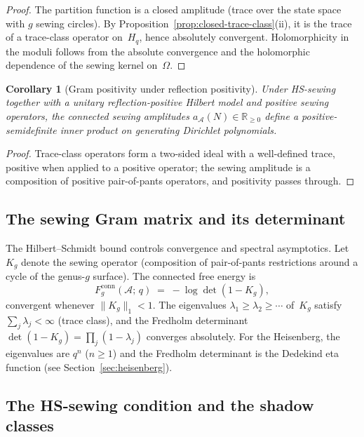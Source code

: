 \documentclass[11pt,reqno]{amsart}
\newtheorem{corollary}[theorem]{Corollary}
\theoremstyle{definition}
\theoremstyle{remark}
\newcommand{\cA}{\mathcal{A}}
\newcommand{\bR}{\mathbb{R}}
\numberwithin{equation}{section}
\begin{document}
\begin{proof}
The partition function is a closed amplitude (trace over the
state space with $g$ sewing circles).  By
Proposition~\ref{prop:closed-trace-class}(ii), it is the trace
of a trace-class operator on~$H_q$, hence absolutely convergent.
Holomorphicity in the moduli follows from the absolute convergence
and the holomorphic dependence of the sewing kernel on~$\Omega$.
\end{proof}

\begin{corollary}[Gram positivity under reflection positivity]
\label{cor:hs-positivity}
Under HS-sewing together with a unitary reflection-positive Hilbert
model and positive sewing operators, the connected sewing amplitudes
$a_\cA(N) \in \bR_{\geq 0}$ define a positive-semidefinite
inner product on generating Dirichlet polynomials.
\end{corollary}

\begin{proof}
Trace-class operators form a two-sided ideal with a well-defined
trace, positive when applied to a positive operator; the sewing
amplitude is a composition of positive pair-of-pants operators,
and positivity passes through.
\end{proof}

\subsection{The sewing Gram matrix and its
 determinant}\label{subsec:gram-matrix}

The Hilbert--Schmidt bound controls convergence and spectral
asymptotics.  Let $K_g$ denote the sewing operator
(composition of pair-of-pants restrictions around a cycle of
the genus-$g$ surface).  The connected free energy is
\begin{equation}\label{eq:connected-free-energy}
F_g^{\mathrm{conn}}(\cA;\,q)
\;=\;
-\log \det(1 - K_g),
\end{equation}
convergent whenever $\|K_g\|_1 < 1$.  The eigenvalues
$\lambda_1 \geq \lambda_2 \geq \cdots$ of~$K_g$ satisfy
$\sum_j \lambda_j < \infty$ (trace class), and the Fredholm
determinant $\det(1 - K_g) = \prod_j(1 - \lambda_j)$ converges
absolutely.  For the Heisenberg, the eigenvalues are $q^n$
($n \geq 1$) and the Fredholm determinant is the Dedekind
eta function (see Section~\ref{sec:heisenberg}).


\subsection{The HS-sewing condition and the shadow
 classes}\label{subsec:hs-shadow}
\end{document}
